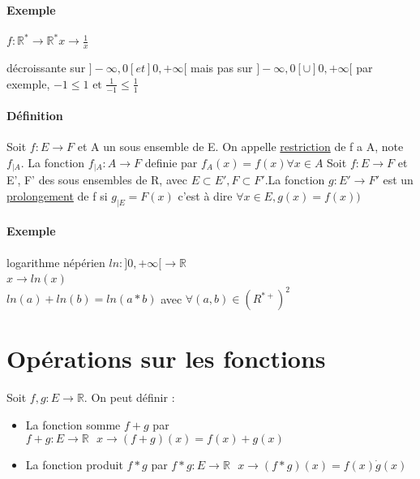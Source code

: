 \paragraph{Exemple} $f: \mathbb{R}^* \rightarrow \mathbb{R}^*
x \rightarrow \frac{1}{x}$


décroissante sur $]-\infty, 0[ et ]0, +\infty[$ mais pas sur $]-\infty, 0[ \cup ]0, +\infty[$
par exemple, $-1 \leq 1 \text{ et } \frac{1}{-1} \leq \frac{1}{1}$

\paragraph{Définition} Soit $f:E \rightarrow F$ et A un sous ensemble de E.
On appelle \ul{restriction} de f a A, note $f_{|A}$. La fonction $f_{|A} : A \rightarrow F$ definie par $f_{A}(x) = f(x) \forall x \in A$
Soit $f:E \rightarrow F$ et E', F' des sous ensembles de R, avec $E \subset E',F \subset F' . $La fonction $ g : E' \rightarrow F'$ est un \ul{prolongement} de f si $g_{|E} = F(x)$ c'est à dire $\forall x \in E, g(x) = f(x))$

\paragraph{Exemple} logarithme népérien $ln : ]0, +\infty[ \rightarrow \mathbb{R}$
	~\\
	$x \rightarrow ln(x)$
	~\\
	$ln(a) + ln(b) = ln(a*b)$ avec $\forall (a, b) \in (R^{*+})^2$


\section{Opérations sur les fonctions}
Soit $f, g : E \rightarrow \mathbb{R}$. On peut définir :

\begin{itemize}
	\item La fonction somme $f+g$ par $f+g : E \rightarrow \mathbb{R} \text{ }
		x\rightarrow(f+g)(x) = f(x)+g(x)$
	\item La fonction produit $f*g$ par $f*g : E \rightarrow \mathbb{R} \text{ }
		x\rightarrow(f*g)(x) = f(x) \dot g(x)$
\end{itemize}

